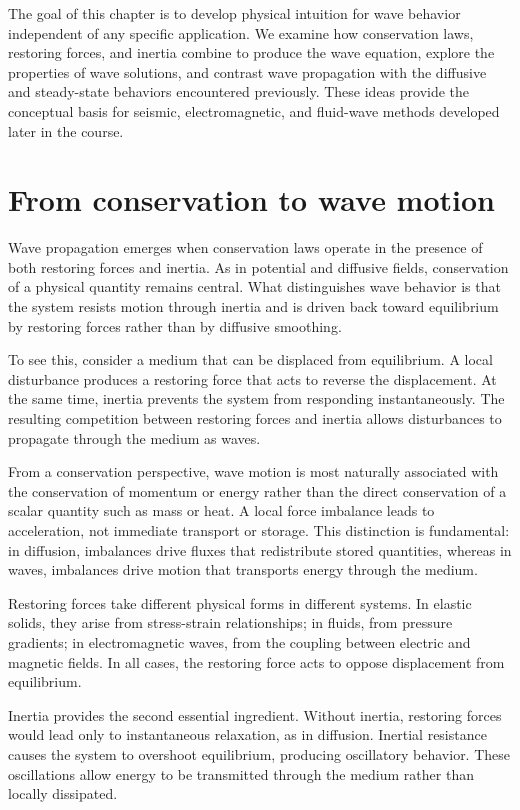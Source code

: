 The goal of this chapter is to develop physical intuition for wave behavior independent of any specific application. We examine how conservation laws, restoring forces, and inertia combine to produce the wave equation, explore the properties of wave solutions, and contrast wave propagation with the diffusive and steady-state behaviors encountered previously. These ideas provide the conceptual basis for seismic, electromagnetic, and fluid-wave methods developed later in the course.

\section{From conservation to wave motion}

Wave propagation emerges when conservation laws operate in the presence of both restoring forces and inertia. As in potential and diffusive fields, conservation of a physical quantity remains central. What distinguishes wave behavior is that the system resists motion through inertia and is driven back toward equilibrium by restoring forces rather than by diffusive smoothing.

To see this, consider a medium that can be displaced from equilibrium. A local disturbance produces a restoring force that acts to reverse the displacement. At the same time, inertia prevents the system from responding instantaneously. The resulting competition between restoring forces and inertia allows disturbances to propagate through the medium as waves.

From a conservation perspective, wave motion is most naturally associated with the conservation of momentum or energy rather than the direct conservation of a scalar quantity such as mass or heat. A local force imbalance leads to acceleration, not immediate transport or storage. This distinction is fundamental: in diffusion, imbalances drive fluxes that redistribute stored quantities, whereas in waves, imbalances drive motion that transports energy through the medium.

Restoring forces take different physical forms in different systems. In elastic solids, they arise from stress-strain relationships; in fluids, from pressure gradients; in electromagnetic waves, from the coupling between electric and magnetic fields. In all cases, the restoring force acts to oppose displacement from equilibrium.

Inertia provides the second essential ingredient. Without inertia, restoring forces would lead only to instantaneous relaxation, as in diffusion. Inertial resistance causes the system to overshoot equilibrium, producing oscillatory behavior. These oscillations allow energy to be transmitted through the medium rather than locally dissipated.

